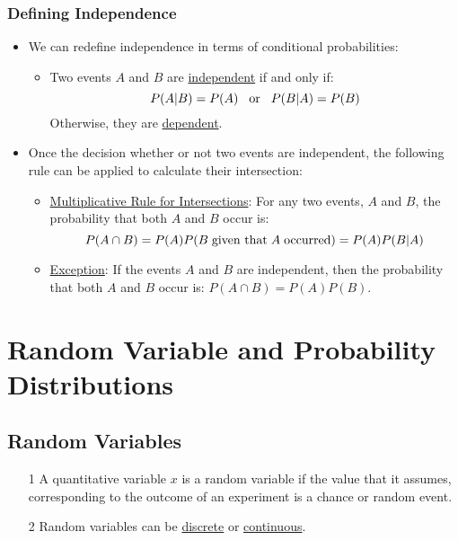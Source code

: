 \documentclass[12pt, letterpaper]{article}
\begin{document}
            \subsubsection{Defining Independence}
                \begin{itemize}
                    \item We can redefine independence in terms of conditional probabilities:
                        \begin{itemize}
                            \item Two events $A$ and $B$ are \underline{independent} if and only if: $$P(A|B) = P(A) \hspace{3mm} \textnormal{or} \hspace{3mm} P(B|A) = P(B)$$ Otherwise, they are \underline{dependent}. 
                        \end{itemize}
                    \item Once the decision whether or not two events are independent, the following rule can be applied to calculate their intersection:
                        \begin{itemize}
                            \item \underline{Multiplicative Rule for Intersections}: For any two events, $A$ and $B$, the probability that both $A$ and $B$ occur is:
                                \begin{equation}
                                    P(A\cap B) = P(A)P(B\hspace{1mm}\textnormal{given that}\hspace{1mm}A\hspace{1mm}\textnormal{occurred}) = P(A)P(B|A)
                                \end{equation}
                            \item \underline{Exception}: If the events $A$ and $B$ are independent, then the probability that both $A$ and $B$ occur is: $P(A\cap B) = P(A)P(B)$.
                        \end{itemize}
                \end{itemize}

    \section{Random Variable and Probability Distributions}
        \subsection{Random Variables}
            \begin{itemize}
                \item[1] A quantitative variable $x$ is a random variable if the value that it assumes, corresponding to the outcome of an experiment is a chance or random event.
                \item[2] Random variables can be \underline{discrete} or \underline{continuous}.
            \end{itemize}
\end{document}
